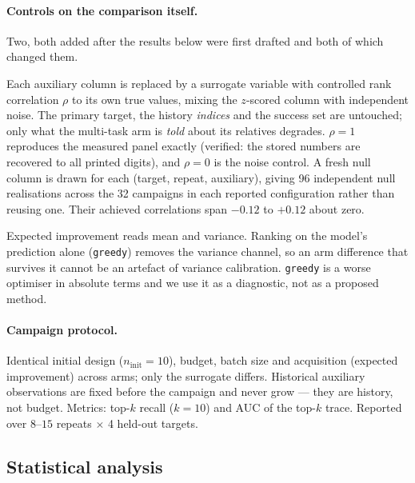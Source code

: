 \documentclass[11pt]{article}
\begin{document}
\paragraph{Controls on the comparison itself.} Two, both added after the
results below were first drafted and both of which changed them.

\begin{description}[leftmargin=2em,style=nextline,itemsep=0.25em]
  \item[Null-information auxiliary.] Each auxiliary column is replaced by a
    surrogate variable with controlled rank correlation $\rho$ to its own
    true values, mixing the $z$-scored column with independent noise. The
    primary target, the history \emph{indices} and the success set are
    untouched; only what the multi-task arm is \emph{told} about its relatives
    degrades. $\rho = 1$ reproduces the measured panel exactly (verified: the
    stored numbers are recovered to all printed digits), and $\rho = 0$ is the
    noise control. A fresh null column is drawn for each (target, repeat,
    auxiliary), giving 96 independent null realisations across the 32 campaigns
    in each reported configuration rather than reusing one. Their achieved
    correlations span $-0.12$ to $+0.12$ about zero.
  \item[Variance-free acquisition.] Expected improvement reads mean and
    variance. Ranking on the model's prediction alone (\texttt{greedy}) removes the
    variance channel, so an arm difference that survives it cannot be an
    artefact of variance calibration. \texttt{greedy} is a worse optimiser in
    absolute terms and we use it as a diagnostic, not as a proposed method.
\end{description}

\paragraph{Campaign protocol.} Identical initial design ($n_{\text{init}} = 10$),
budget, batch size and acquisition (expected improvement) across arms; only the
surrogate differs. Historical auxiliary observations are fixed before the
campaign and never grow --- they are history, not budget. Metrics: top-$k$
recall ($k = 10$) and AUC of the top-$k$ trace. Reported over $8$--$15$ repeats
$\times$ 4 held-out targets.

\subsection{Statistical analysis}
\label{sec:stats}
\end{document}
